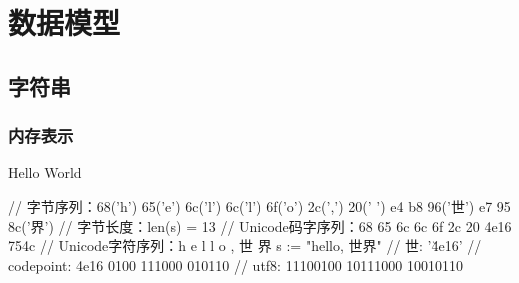 \begin{savequote}[45mm]
\end{savequote}

\chapter{数据模型} 
\label{ch:string}

\begin{content}

\end{content}

\section{字符串}

\begin{content}

\subsection{内存表示}

\begin{nodiff}{Hello World}
 \begin{go}
// 字节序列：68('h') 65('e') 6c('l') 6c('l') 6f('o') 2c(',') 20(' ') e4 b8 96('世') e7 95 8c('界')
// 字节长度：len(s) = 13
// Unicode码字序列：68 65 6c 6c 6f 2c 20 4e16 754c
// Unicode字符序列：h  e  l  l  o  ,     世    界
s := "hello, 世界"
// 世: '\u4e16'
// codepoint:   4e16     0100   111000   010110
// utf8:             11100100 10111000 10010110
 \end{go}
\end{nodiff}





\end{content}
